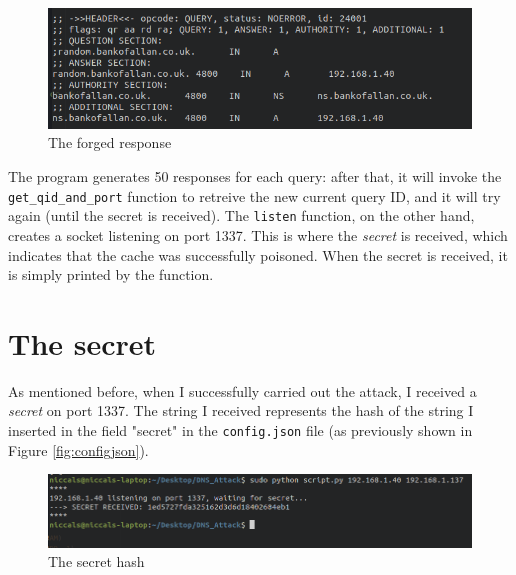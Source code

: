 \documentclass[a4paper]{article}
\begin{document}
	\begin{figure}[H]
		\centering
		\includegraphics[width=1\linewidth]{forged_response}
		\caption{The forged response}
		\label{fig:forgedresponse}
	\end{figure}
	The program generates 50 responses for each query: after that, it will invoke the \texttt{get\_qid\_and\_port} function to retreive the new current query ID, and it will try again (until the secret is received).
	\newpage
	The \texttt{listen} function, on the other hand, creates a socket listening on port 1337. This is where the \textit{secret} is received, which indicates that the cache was successfully poisoned. When the secret is received, it is simply printed by the function.

\section{The secret}
	As mentioned before, when I successfully carried out the attack, I received a \textit{secret} on port 1337. The string I received represents the hash of the string I inserted in the field "secret" in the \texttt{config.json} file (as previously shown in Figure \ref{fig:configjson}).
	\begin{figure}[H]
		\centering
		\includegraphics[width=1\linewidth]{secret}
		\caption{The secret hash}
		\label{fig:secret}
	\end{figure}
\end{document}
